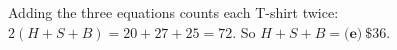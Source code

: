 Adding the three equations counts each T-shirt twice: $2(H+S+B)=20+27+25=72$. So $H+S+B=\boxed{\textbf{(e)}\ \$36}$.
